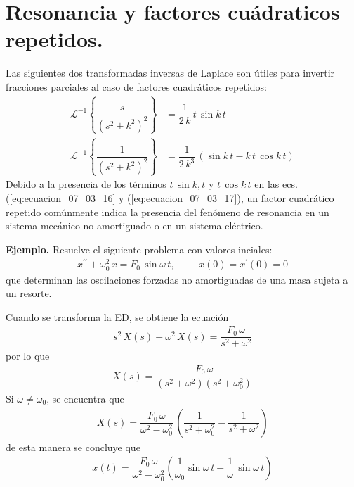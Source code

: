 \section{Resonancia y factores cuádraticos repetidos.}
Las siguientes dos transformadas inversas de Laplace son útiles para invertir fracciones parciales al caso de factores cuadráticos repetidos:
\begin{align}
\mathscr{L}^{-1} \left\{ \dfrac{s}{(s^{2} + k^{2})^{2}} \right\} &= \dfrac{1}{2 \, k} \, t \, \sin k \, t \label{eq:ecuacion_07_03_16} \\
\mathscr{L}^{-1} \left\{ \dfrac{1}{(s^{2} + k^{2})^{2}} \right\} &= \dfrac{1}{2 \, k^{3}} \, (\sin k \, t - k \, t \, \cos k \, t) \label{eq:ecuacion_07_03_17}
\end{align}
Debido a la presencia de los términos $t \, \sin k , t$ y $t \, \cos k \, t$ en las ecs. (\ref{eq:ecuacion_07_03_16} y (\ref{eq:ecuacion_07_03_17}), un factor cuadrático repetido comúnmente indica la presencia del fenómeno de resonancia en un sistema mecánico no amortiguado o en un sistema eléctrico.
\par
\textbf{Ejemplo.}
Resuelve el siguiente problema con valores inciales:
\begin{align*}
x^{\prime \prime} + \omega_{0}^{2} \, x = F_{0} \, \sin \omega \, t, \hspace{1cm} x(0) = x^{\prime}(0) = 0
\end{align*}
que determinan las oscilaciones forzadas no amortiguadas de una masa sujeta a un resorte.
\par
Cuando se transforma la ED, se obtiene la ecuación
\begin{align*}
s^{2} \, X(s) + \omega^{2} \, X(s) = \dfrac{F_{0} \, \omega}{s^{2} + \omega^{2}}
\end{align*}
por lo que
\begin{align*}
 X(s) = \dfrac{F_{0} \, \omega}{(s^{2} + \omega^{2})(s^{2} + \omega_{0}^{2})}
\end{align*}
Si $\omega \neq \omega_{0}$, se encuentra que
\begin{align*}
X(s) = \dfrac{F_{0} \, \omega}{\omega^{2} - \omega_{0}^{2}} \, \left( \dfrac{1}{s^{2}+ \omega_{0}^{2}} - \dfrac{1}{s^{2} + \omega^{2}} \right)
\end{align*}
de esta manera se concluye que
\begin{align*}
x(t) = \dfrac{F_{0} \, \omega}{\omega^{2} - \omega_{0}^{2}} \left( \dfrac{1}{\omega_{0}} \sin \omega \, t - \dfrac{1}{\omega} \, \sin \omega \, t \right)
\end{align*}
